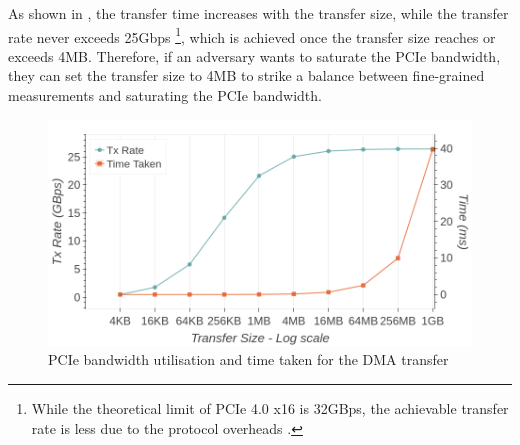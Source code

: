 
As shown in , the transfer time increases with the transfer size, while the transfer rate never exceeds 25Gbps
\footnote{While the theoretical limit of PCIe 4.0 x16 is 32GBps, the achievable transfer rate is less due to the protocol overheads \cite{neugebauer2018understanding}.},
which is achieved once the transfer size reaches or exceeds 4MB.
Therefore, if an adversary wants to saturate the PCIe bandwidth, they can set the transfer size to 4MB to strike a balance between fine-grained measurements and saturating the PCIe bandwidth.

\begin{figure}[!htb]
    \centering
    \includegraphics[width=\columnwidth]{figures/interconnect-sc/dma/bw_util_and_time_per_size.png}
    \caption{PCIe bandwidth utilisation and time taken for the DMA transfer}
    \label{fig:bw-util-and-time-per-size}
\end{figure}
